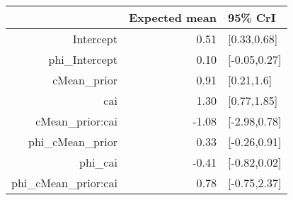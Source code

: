 \begin{tabular}{rrl}
  \hline
 & Expected mean & 95\% CrI \\ 
  \hline
Intercept & 0.51 & [0.33,0.68] \\ 
  phi\_Intercept & 0.10 & [-0.05,0.27] \\ 
  cMean\_prior & 0.91 & [0.21,1.6] \\ 
  cai & 1.30 & [0.77,1.85] \\ 
  cMean\_prior:cai & -1.08 & [-2.98,0.78] \\ 
  phi\_cMean\_prior & 0.33 & [-0.26,0.91] \\ 
  phi\_cai & -0.41 & [-0.82,0.02] \\ 
  phi\_cMean\_prior:cai & 0.78 & [-0.75,2.37] \\ 
   \hline
\end{tabular}

